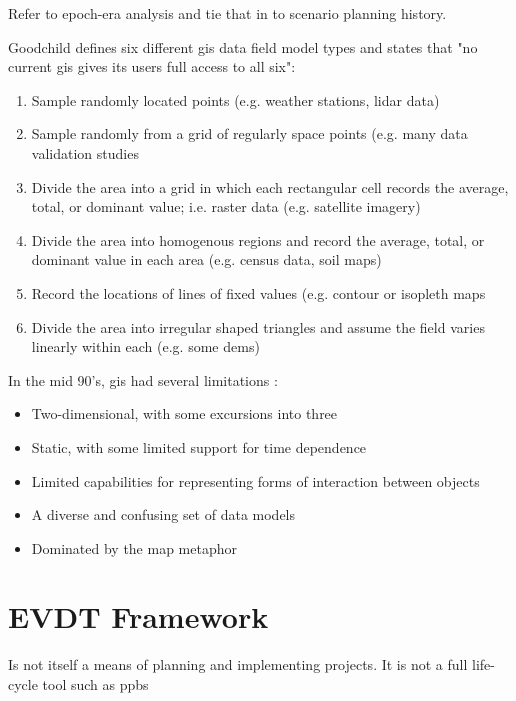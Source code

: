 Refer to epoch-era analysis and tie that in to scenario planning history.

Goodchild defines six different \ac{gis} data field model types and states that "no current \ac{gis} gives its users full access to all six":

\begin{enumerate}
    \setlength{\itemsep}{0pt}%
    \setlength{\parskip}{0pt}%
	\item{Sample randomly located points (e.g. weather stations, \ac{lidar} data)}
	\item{Sample randomly from a grid of regularly space points (e.g. many data validation studies}
	\item{Divide the area into a grid in which each rectangular cell records the average, total, or dominant value; i.e. raster data (e.g. satellite imagery)}
	\item{Divide the area into homogenous regions and record the average, total, or dominant value in each area (e.g. census data, soil maps)}
	\item{Record the locations of lines of fixed values (e.g. contour or isopleth maps}
	\item{Divide the area into irregular shaped triangles and assume the field varies linearly within each (e.g. some \acp{dem})}
\end{enumerate}

In the mid 90's, \ac{gis} had several limitations \cite{goodchildGeographicInformationSystems1994}:

\begin{itemize}
    \setlength{\itemsep}{0pt}%
    \setlength{\parskip}{0pt}%
	\item{Two-dimensional, with some excursions into three}
	\item{Static, with some limited support for time dependence}
	\item{Limited capabilities for representing forms of interaction between objects}
	\item{A diverse and confusing set of data models}
	\item{Dominated by the map metaphor}
\end{itemize}

\section{EVDT Framework}

Is not itself a means of planning and implementing projects. It is not a full life-cycle tool such as \ac{ppbs} \cite{hatryCriteriaEvaluationPlanning1972}


